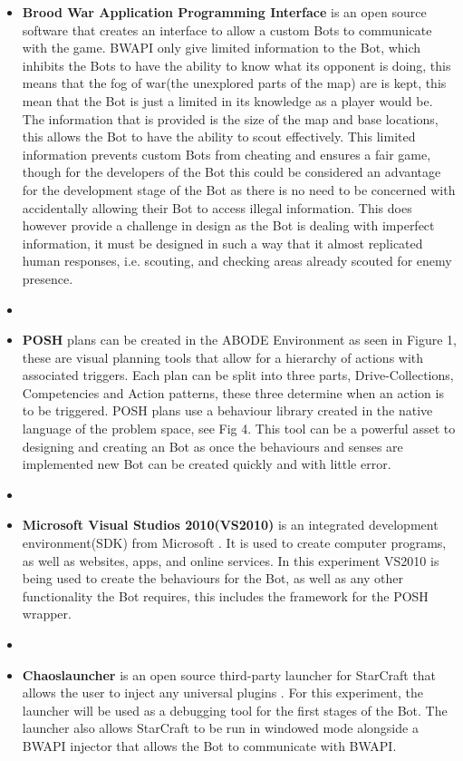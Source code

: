 \documentclass[journal]{IEEEtran}
\begin{document}
	\begin{itemize}
		\item \textbf{Brood War Application Programming Interface} \cite{BWAPI} is an open source software that creates an interface to allow a custom Bots to communicate with the game. BWAPI only give limited information to the Bot, which inhibits the Bots to have the ability to know what its opponent is doing, this means that the fog of war(the unexplored parts of the map) are is kept\cite{POSH}, this mean that the Bot is just a limited in its knowledge as a player would be. The information that is provided is the size of the map and base locations, this allows the Bot to have the ability to scout effectively. This limited information prevents custom Bots from cheating and ensures a fair game, though for the developers of the Bot this could be considered an advantage for the development stage of the Bot as there is no need to be concerned with accidentally allowing their Bot to access illegal information. This does however provide a challenge in design as the Bot is dealing with imperfect information, it must be designed in such a way that it almost replicated human responses, i.e. scouting, and checking areas already scouted for enemy presence.
		\item[]
		\item \textbf{POSH} plans can be created in the ABODE Environment as seen in Figure 1, these are visual planning tools that allow for a hierarchy of actions with associated triggers. Each plan can be split into three parts, Drive-Collections, Competencies and Action patterns, these three determine when an action is to be triggered. POSH plans use a behaviour library created in the native language of the problem space, see Fig 4. This tool can be a powerful asset to designing and creating an Bot as once the behaviours and senses are implemented new Bot can be created quickly and with little error.
		\item[]
		\item \textbf{Microsoft Visual Studios 2010(VS2010)} is an integrated development environment(SDK) from Microsoft \cite{Visual}. It is used to create computer programs, as well as websites, apps, and online services. In this experiment VS2010 is being used to create the behaviours for the Bot, as well as any other functionality the Bot requires, this includes the framework for the POSH wrapper.
		\item[]
		\item \textbf{Chaoslauncher} is an open source third-party launcher for StarCraft that allows the user to inject any universal plugins \cite{Chaos}. For this experiment, the launcher will be used as a debugging tool for the first stages of the Bot. The launcher also allows StarCraft to be run in windowed mode alongside a BWAPI injector that allows the Bot to communicate with BWAPI.    

\end{itemize}
\end{document}
